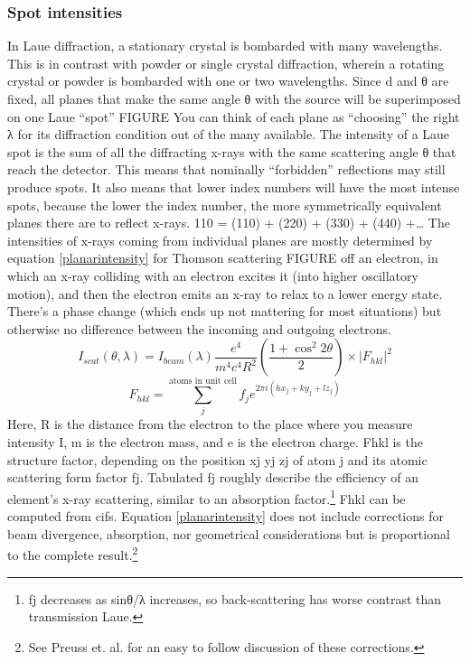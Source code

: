 \subsubsection{Spot intensities}
In Laue diffraction, a stationary crystal is bombarded with many wavelengths. This is in contrast with powder or single crystal diffraction, wherein a rotating crystal or powder is bombarded with one or two wavelengths. Since d and θ are fixed, all planes that make the same angle θ with the source will be superimposed on one Laue “spot” FIGURE
You can think of each plane as “choosing” the right λ for its diffraction condition out of the many available. The intensity of a Laue spot is the sum of all the diffracting x-rays with the same scattering angle θ that reach the detector.
This means that nominally “forbidden” reflections may still produce spots.
It also means that lower index numbers will have the most intense spots, because the lower the index number, the more symmetrically equivalent planes there are to reflect x-rays.
{110} = (110) + (220) + (330) + (440) +…
The intensities of x-rays coming from individual planes are mostly determined by equation \ref{planarintensity} for Thomson scattering FIGURE off an electron, in which an x-ray colliding with an electron excites it (into higher oscillatory motion), and then the electron emits an x-ray to relax to a lower energy state. There’s a phase change (which ends up not mattering for most situations) but otherwise no difference between the incoming and outgoing electrons. 
\begin{equation}
    I_{scat}(\theta,\lambda)=I_{beam}(\lambda)\frac{e^4}{m^4c^4R^2}(\frac{1+\cos^2{2\theta}}{2})\times|F_{hkl}|^2
    \label{planarintensity}
\end{equation}
\begin{equation}
    F_{hkl}= \sum_{j}^{\text{atoms in unit cell}} f_je^{2\pi i(hx_j+ky_j+lz_j)}
    \label{Fhkl}
\end{equation}
Here, R is the distance from the electron to the place where you measure intensity I, m is the electron mass, and e is the electron charge. Fhkl is the structure factor, depending on the position xj yj zj of atom j and its atomic scattering form factor fj. Tabulated fj roughly describe the efficiency of an element’s x-ray scattering, similar to an absorption factor.\footnote{fj decreases as sinθ/λ increases, so back-scattering has worse contrast than transmission Laue.} Fhkl can be computed from cifs. Equation \ref{planarintensity} does not include corrections for beam divergence, absorption, nor geometrical considerations but is proportional to the complete result.\footnote{See Preuss et. al. for an easy to follow discussion of these corrections.}
